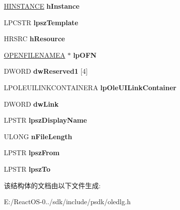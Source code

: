 \begin{DoxyCompactItemize}
\hyperlink{interfacevoid}{H\+I\+N\+S\+T\+A\+N\+CE} {\bfseries h\+Instance}
\item 
\mbox{\label{structtag_o_l_e_u_i_c_h_a_n_g_e_s_o_u_r_c_e_a_a71c8f1177df9612fcbcce8e1af959d92}} 
L\+P\+C\+S\+TR {\bfseries lpsz\+Template}
\item 
\mbox{\label{structtag_o_l_e_u_i_c_h_a_n_g_e_s_o_u_r_c_e_a_ae72356a2772c288ef45872abe036859a}} 
H\+R\+S\+RC {\bfseries h\+Resource}
\item 
\mbox{\label{structtag_o_l_e_u_i_c_h_a_n_g_e_s_o_u_r_c_e_a_aba688705158385e2ad734f266e0bb325}} 
\hyperlink{structtag_o_f_n_a}{O\+P\+E\+N\+F\+I\+L\+E\+N\+A\+M\+EA} $\ast$ {\bfseries lp\+O\+FN}
\item 
\mbox{\label{structtag_o_l_e_u_i_c_h_a_n_g_e_s_o_u_r_c_e_a_a7529720dfd8c800a374421897141a907}} 
D\+W\+O\+RD {\bfseries dw\+Reserved1} \mbox{[}4\mbox{]}
\item 
\mbox{\label{structtag_o_l_e_u_i_c_h_a_n_g_e_s_o_u_r_c_e_a_a95341cd4c15e901bbb877fcc88c869c4}} 
L\+P\+O\+L\+E\+U\+I\+L\+I\+N\+K\+C\+O\+N\+T\+A\+I\+N\+E\+RA {\bfseries lp\+Ole\+U\+I\+Link\+Container}
\item 
\mbox{\label{structtag_o_l_e_u_i_c_h_a_n_g_e_s_o_u_r_c_e_a_acdb566805f3466c0b4837882807e7c6a}} 
D\+W\+O\+RD {\bfseries dw\+Link}
\item 
\mbox{\label{structtag_o_l_e_u_i_c_h_a_n_g_e_s_o_u_r_c_e_a_abc68db3f1ebd339d3d67668b2e50a12c}} 
L\+P\+S\+TR {\bfseries lpsz\+Display\+Name}
\item 
\mbox{\label{structtag_o_l_e_u_i_c_h_a_n_g_e_s_o_u_r_c_e_a_a07aafd6384f21f6e5d45d59d141f0380}} 
U\+L\+O\+NG {\bfseries n\+File\+Length}
\item 
\mbox{\label{structtag_o_l_e_u_i_c_h_a_n_g_e_s_o_u_r_c_e_a_a80c7f2ed131664735828a848a2b73334}} 
L\+P\+S\+TR {\bfseries lpsz\+From}
\item 
\mbox{\label{structtag_o_l_e_u_i_c_h_a_n_g_e_s_o_u_r_c_e_a_a72901edcfee863131dcbc1472b5454c1}} 
L\+P\+S\+TR {\bfseries lpsz\+To}
\end{DoxyCompactItemize}


该结构体的文档由以下文件生成\+:\begin{DoxyCompactItemize}
\item 
E\+:/\+React\+O\+S-\/0../sdk/include/psdk/oledlg.\+h\end{DoxyCompactItemize}
